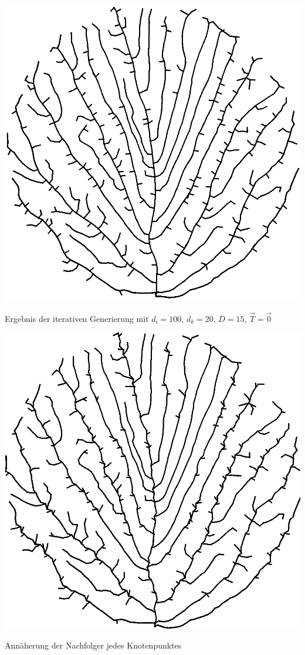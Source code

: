 \newpage
{}
\begin{center}
	\includegraphics[height=.9\textheight]{images/CH3_SCA_Extended2.png}
	
	Ergebnis der iterativen Generierung	 mit $d_i = 100$, $d_k=20$, $D=15$, $\overrightarrow{T} = \overrightarrow{0}$			
\end{center}




\newpage
{}
\begin{center}
	\includegraphics[height=.9\textheight]{images/CH3_SCA_Extended3.png}
	
	Annäherung der Nachfolger jedes Knotenpunktes
\end{center}





